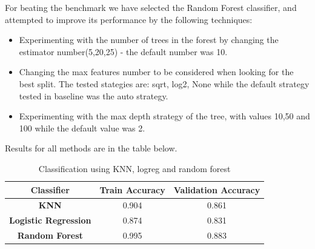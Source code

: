 \documentclass[12pt]{article}
\begin{document}
  For beating the benchmark we have selected the Random Forest classifier, and attempted to improve its performance by the following techniques:
	\begin{itemize}
		\item Experimenting with the number of trees in the forest by changing the estimator number(5,20,25) - the default number was 10.
		\item Changing the max features number to be considered when looking for the best split. The tested stategies are: sqrt, log2, None while the default strategy tested in baseline was the auto strategy.
		\item Experimenting with the max depth strategy of the tree, with values 10,50 and 100 while the default value was 2.
	\end{itemize}

  Results for all methods are in the table below.
 
 \begin{table}[H]
 	\centering
 	\begin{tabular}{|c|c|c|}
 		\hline
 		\textbf{Classifier}            & \textbf{Train Accuracy} & \textbf{Validation Accuracy} \\ \hline
 		\textbf{KNN}                 & 0.904                   & 0.861                        \\ \hline
 		\textbf{Logistic Regression} & 0.874                   & 0.831                        \\ \hline
 		\textbf{Random Forest}       & 0.995                   & 0.883                        \\ \hline
 	\end{tabular}
 \caption{Classification using KNN, logreg and random forest}
 \label{class}
 \end{table}
\end{document}
